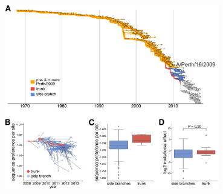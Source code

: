 \documentclass[9pt,twocolumn,twoside]{pnas-new}
\begin{document}
\begin{suppfigure}[H]
\centerline{\includegraphics[clip=true, trim=0 5.5in 0 0,width=0.7\textwidth]{figs/S04_post_Perth2009/post_Perth2009_seqpref.pdf}}
\caption{\label{suppfig:tree}
{\bf A phylogenetic tree of all HA sequences used in our analysis of mutation frequencies.}
HA sequences were sampled at a rate of six viruses per month from January 1, 1968 through February 1, 2018.
The Perth/2009 strain used in our experiments is indicated.
The rest of the tree is partitioned into nodes that preceded the split of the Perth/2009 strain from the trunk of the tree (blue) and nodes that branched off the trunk after the clade containing Perth/2009 (orange).
In Figure~\ref{fig:muteffect_maxfreq}, these two partitions of the tree are analyzed separately.
Nodes in the clade containing the Perth/2009 strain and nodes sampled in 2014 or after were excluded from our analyses.
}
\end{suppfigure}
\end{document}
